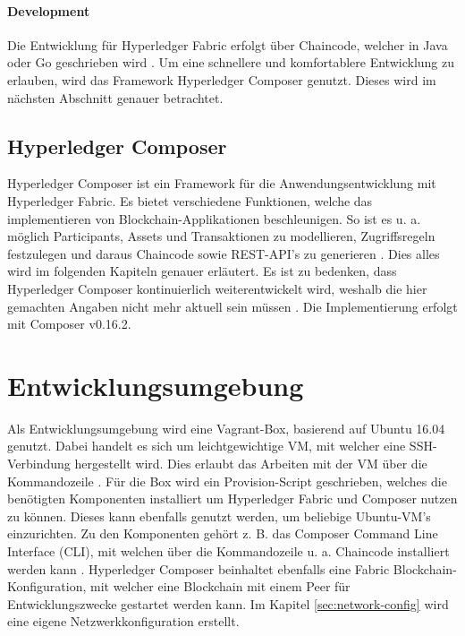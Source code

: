 \paragraph{Development}
Die Entwicklung für Hyperledger Fabric erfolgt über Chaincode, welcher in Java oder Go geschrieben wird \cite{HyperledgerFabricTeamSDKsHyperledgerFabric}. Um eine schnellere und komfortablere Entwicklung zu erlauben, wird das Framework Hyperledger Composer genutzt. Dieses wird im nächsten Abschnitt genauer betrachtet.


\subsection{Hyperledger Composer}
Hyperledger Composer ist ein Framework für die Anwendungsentwicklung mit Hyperledger Fabric. Es bietet verschiedene Funktionen, welche das implementieren von Blockchain-Applikationen beschleunigen. So ist es u. a. möglich Participants, Assets und Transaktionen zu modellieren, Zugriffsregeln festzulegen und daraus Chaincode sowie REST-API's zu generieren \cite{HyperledgerComposerTeamIntroductionHyperledgerComposer}. Dies alles wird im folgenden Kapiteln genauer erläutert. Es ist zu bedenken, dass Hyperledger Composer kontinuierlich weiterentwickelt wird, weshalb die hier gemachten Angaben nicht mehr aktuell sein müssen \cite{HyperledgerComposerTeamHyperledgerComposerReleases2018}. Die Implementierung erfolgt mit Composer v0.16.2.

\section{Entwicklungsumgebung}
Als Entwicklungsumgebung wird eine Vagrant-Box, basierend auf Ubuntu 16.04 genutzt. Dabei handelt es sich um leichtgewichtige VM, mit welcher eine SSH-Verbindung hergestellt wird. Dies erlaubt das Arbeiten mit der VM über die Kommandozeile \cite{VagrantTeamVagrantHashiCorp}. Für die Box wird ein Provision-Script geschrieben, welches die benötigten Komponenten installiert um Hyperledger Fabric und Composer nutzen zu können. Dieses kann ebenfalls genutzt werden, um beliebige Ubuntu-VM's einzurichten. Zu den Komponenten gehört z. B. das Composer Command Line Interface (CLI), mit welchen über die Kommandozeile u. a. Chaincode installiert werden kann \cite{HyperledgerComposerTeamDevelopmentEnvironmentHyperledger}. Hyperledger Composer beinhaltet ebenfalls eine Fabric Blockchain-Konfiguration, mit welcher eine Blockchain mit einem Peer für Entwicklungszwecke gestartet werden kann. Im Kapitel \ref{sec:network-config} wird eine eigene Netzwerkkonfiguration erstellt.

